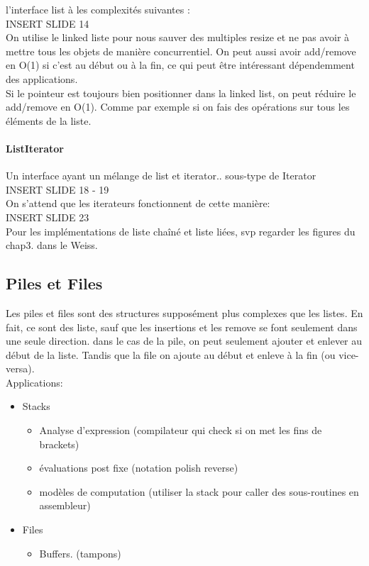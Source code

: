 \documentclass[oneside]{book}
\begin{document}
l'interface list à les complexités suivantes :\\

INSERT SLIDE 14\\

On utilise le linked liste pour nous sauver des multiples resize et ne pas avoir à mettre tous les objets de manière concurrentiel. On peut aussi avoir add/remove en O(1) si c'est au début ou à la fin, ce qui peut être intéressant dépendemment des applications.\\

Si le pointeur est toujours bien positionner dans la linked list, on peut réduire le add/remove en O(1). Comme par exemple si on fais des opérations sur tous les éléments de la liste.\\


\paragraph{ListIterator}
Un interface ayant un mélange de list et iterator.. sous-type de Iterator\\

INSERT SLIDE 18 - 19\\

On s'attend que les iterateurs fonctionnent de cette manière:\\

INSERT SLIDE 23\\

Pour les implémentations de liste chaîné et liste liées, svp regarder les figures du chap3. dans le Weiss.

\subsection{Piles et Files}

Les piles et files sont des structures supposément plus complexes que les listes. En fait, ce sont des liste, sauf que les insertions et les remove se font seulement dans une seule direction. dans le cas de la pile, on peut seulement ajouter et enlever au début de la liste. Tandis que la file on ajoute au début et enleve à la fin (ou vice-versa).\\

Applications:
\begin{itemize}
\item Stacks
\begin{itemize}
\item Analyse d'expression (compilateur qui check si on met les fins de brackets)
\item évaluations post fixe (notation polish reverse)
\item modèles de computation (utiliser la stack pour caller des sous-routines en assembleur)
\end{itemize}

\item Files
\begin{itemize}
\item Buffers. (tampons)
\end{itemize}
\end{itemize}
\end{document}
